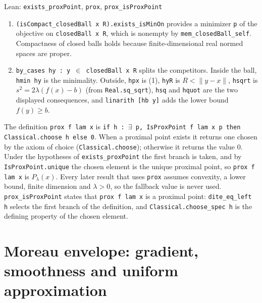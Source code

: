 \documentclass[11pt,a4paper]{report}
\begin{document}
\begin{leanbox}{Lean: \texttt{exists\_\allowbreak{}proxPoint}, \texttt{prox}, \texttt{prox\_\allowbreak{}isProxPoint}}
\begin{enumerate}
\item \texttt{(is\allowbreak{}Compact\_\allowbreak{}closed\allowbreak{}Ball x R).\allowbreak{}exists\_\allowbreak{}is\allowbreak{}Min\allowbreak{}On} provides a minimizer \texttt{p} of the objective on \texttt{closed\allowbreak{}Ball x R}, which is nonempty by \texttt{mem\_\allowbreak{}closed\allowbreak{}Ball\_\allowbreak{}self}. Compactness of closed balls holds because finite-dimensional real normed spaces are proper.

\item \texttt{by\_\allowbreak{}cases hy : y \ensuremath{\in} closed\allowbreak{}Ball x R} splits the competitors. Inside the ball, \texttt{hmin hy} is the minimality. Outside, \texttt{hpx} is (1), \texttt{hy\allowbreak{}R} is \(R<\|y-x\|\), \texttt{hsqrt} is \(s^2=2\lambda(f(x)-b)\) (from \texttt{Real.\allowbreak{}sq\_\allowbreak{}sqrt}), \texttt{hsq} and \texttt{hquot} are the two displayed consequences, and \texttt{linarith [hb y]} adds the lower bound \(f(y)\ge b\).

\end{enumerate}



The definition \texttt{prox f lam x} is \texttt{if h : \ensuremath{\exists} p, Is\allowbreak{}Prox\allowbreak{}Point f lam x p then Classical.\allowbreak{}choose h else 0}. When a proximal point exists it returns one chosen by the axiom of choice (\texttt{Classical.\allowbreak{}choose}); otherwise it returns the value \(0\). Under the hypotheses of \texttt{exists\_\allowbreak{}prox\allowbreak{}Point} the first branch is taken, and by \texttt{Is\allowbreak{}Prox\allowbreak{}Point.\allowbreak{}unique} the chosen element is the unique proximal point, so \texttt{prox f lam x} is \(P_\lambda(x)\). Every later result that uses \texttt{prox} assumes convexity, a lower bound, finite dimension and \(\lambda>0\), so the fallback value is never used. \texttt{prox\_\allowbreak{}is\allowbreak{}Prox\allowbreak{}Point} states that \texttt{prox f lam x} is a proximal point: \texttt{dite\_\allowbreak{}eq\_\allowbreak{}left h} selects the first branch of the definition, and \texttt{Classical.\allowbreak{}choose\_\allowbreak{}spec h} is the defining property of the chosen element.
\end{leanbox}
\section{\texorpdfstring{Moreau envelope: gradient, smoothness and uniform approximation}{Moreau envelope: gradient, smoothness and uniform approximation}}
\label{proof-module-ProximalLangevin-Moreau-lean}
\end{document}
